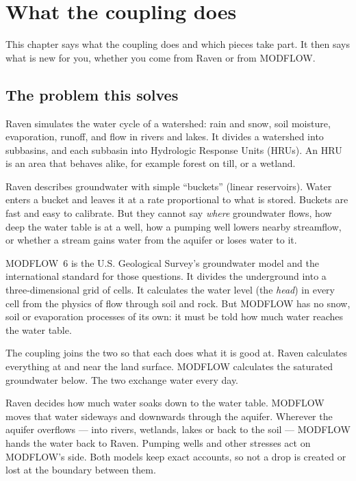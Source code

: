 \chapter{What the coupling does}\label{uch:intro}\label{ch:c1}\label{ch:intro}
This chapter says what the coupling does and which pieces take part. It then says what is new for you, whether you
come from Raven or from MODFLOW.

\section{The problem this solves}
Raven \cite{craig2020raven} simulates the water cycle of a watershed: rain and snow, soil moisture, evaporation, runoff,
and flow in rivers and lakes. It divides a watershed into subbasins, and each subbasin into Hydrologic Response Units
(HRUs). An HRU is an area that behaves alike, for example forest on till, or a wetland.

Raven describes groundwater with simple ``buckets'' (linear reservoirs). Water enters a bucket and leaves it at a rate
proportional to what is stored. Buckets are fast and easy to calibrate. But they cannot say \emph{where} groundwater
flows, how deep the water table is at a well, how a pumping well lowers nearby streamflow, or whether a stream gains water
from the aquifer or loses water to it.

MODFLOW~6 \cite{langevin2017mf6} is the U.S. Geological Survey's groundwater model and the international standard for
those questions. It divides the underground into a three-dimensional grid of cells. It calculates the water level (the
\emph{head}) in every cell from the physics of flow through soil and rock. But MODFLOW has no snow, soil or evaporation
processes of its own: it must be told how much water reaches the water table.

The coupling joins the two so that each does what it is good at. Raven calculates everything at and near the land
surface. MODFLOW calculates the saturated groundwater below. The two exchange water every day.

\begin{plain}
Raven decides how much water soaks down to the water table. MODFLOW moves that water sideways and downwards through
the aquifer. Wherever the aquifer overflows --- into rivers, wetlands, lakes or back to the soil --- MODFLOW hands the
water back to Raven. Pumping wells and other stresses act on MODFLOW's side. Both models keep exact accounts, so not
a drop is created or lost at the boundary between them.
\end{plain}

